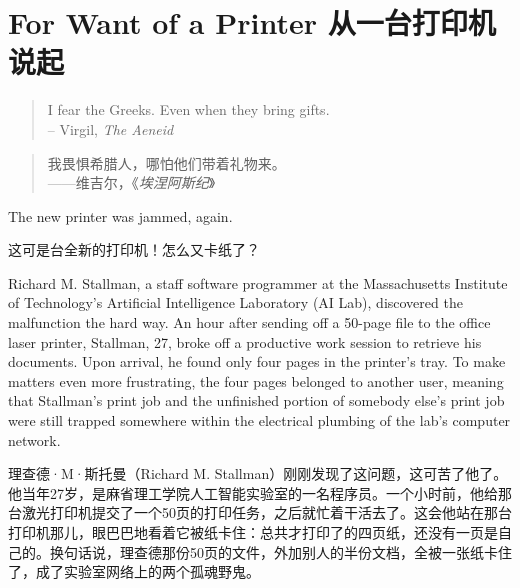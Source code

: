 ﻿%
\chapter{\ifdefined\eng
For Want of a Printer
\fi
\ifdefined\chs
从一台打印机说起
\fi
}

\ifdefined\eng
\begin{quotation}
  \begin{flushright}
    I fear the Greeks. Even when they bring gifts.\\
    -- Virgil, \textit{The Aeneid}
  \end{flushright}
\end{quotation}
\fi

\ifdefined\chs
\begin{quotation}
  \begin{flushright}
   我畏惧希腊人，哪怕他们带着礼物来。\\
    ——维吉尔，《\textit{埃涅阿斯纪}》
  \end{flushright}
\end{quotation}
\fi

\ifdefined\eng
The new printer was jammed, again.
\fi

\ifdefined\chs
这可是台全新的打印机！怎么又卡纸了？
\fi

\ifdefined\eng
Richard M. Stallman, a staff software programmer at the Massachusetts Institute of Technology's Artificial Intelligence Laboratory (AI Lab), discovered the malfunction the hard way. An hour after sending off a 50-page file to the office laser printer, Stallman, 27, broke off a productive work session to retrieve his documents. Upon arrival, he found only four pages in the printer's tray. To make matters even more frustrating, the four pages belonged to another user, meaning that Stallman's print job and the unfinished portion of somebody else's print job were still trapped somewhere within the electrical plumbing of the lab's computer network.
\fi

\ifdefined\chs
理查德·M·斯托曼（Richard M. Stallman）刚刚发现了这问题，这可苦了他了。他当年27岁，是麻省理工学院人工智能实验室的一名程序员。一个小时前，他给那台激光打印机提交了一个50页的打印任务，之后就忙着干活去了。这会他站在那台打印机那儿，眼巴巴地看着它被纸卡住：总共才打印了的四页纸，还没有一页是自己的。换句话说，理查德那份50页的文件，外加别人的半份文档，全被一张纸卡住了，成了实验室网络上的两个孤魂野鬼。
\fi

